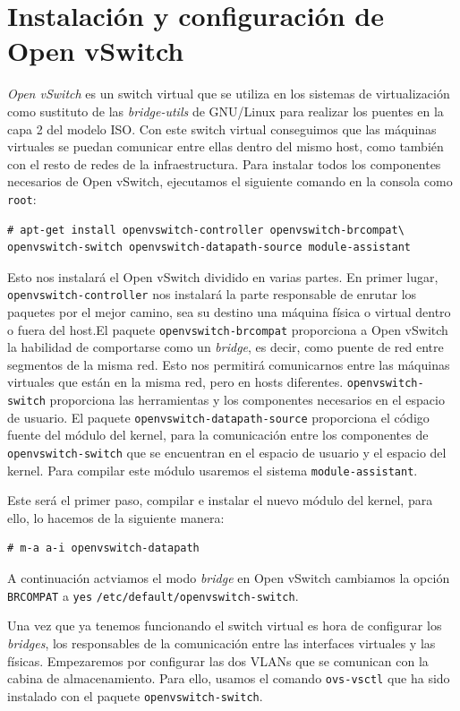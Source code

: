 \documentclass[12pt,a4paper,titlepage,twoside]{report}
\begin{document}
\section{Instalación y configuración de Open vSwitch}
\textit{Open vSwitch}\cite{ovs} es un switch virtual que se utiliza en los sistemas de virtualización como sustituto de las \textit{bridge-utils} de GNU/Linux para realizar los puentes en la capa 2 del modelo ISO. Con este switch virtual conseguimos que las máquinas virtuales se puedan comunicar entre ellas dentro del mismo host, como también con el resto de redes de la infraestructura.
Para instalar todos los componentes necesarios de Open vSwitch, ejecutamos el siguiente comando en la consola como \verb|root|: 
\begin{verbatim}
# apt-get install openvswitch-controller openvswitch-brcompat\
openvswitch-switch openvswitch-datapath-source module-assistant
\end{verbatim}
Esto nos instalará el Open vSwitch dividido en varias partes. En primer lugar, \verb|openvswitch-controller| nos instalará la parte responsable de enrutar los paquetes por el mejor camino, sea su destino una máquina física o virtual dentro o fuera del host.El paquete \verb|openvswitch-brcompat| proporciona a Open vSwitch la habilidad de comportarse como un \textit{bridge}, es decir, como puente de red entre segmentos de la misma red. Esto nos permitirá comunicarnos entre las máquinas virtuales que están en la misma red, pero en hosts diferentes. \verb|openvswitch-switch| proporciona las herramientas y los componentes necesarios en el espacio de usuario. El paquete \verb|openvswitch-datapath-source| proporciona el código fuente del módulo del kernel, para la comunicación entre los componentes de \verb|openvswitch-switch| que se encuentran en el espacio de usuario y el espacio del kernel. Para compilar este módulo usaremos el sistema \verb|module-assistant|.
\par
Este será el primer paso, compilar e instalar el nuevo módulo del kernel, para ello, lo hacemos de la siguiente manera:
\begin{verbatim}
# m-a a-i openvswitch-datapath 
\end{verbatim}
A continuación actviamos el modo \textit{bridge} en Open vSwitch cambiamos la opción \verb|BRCOMPAT| a \verb|yes| \verb|/etc/default/openvswitch-switch|.
\par
Una vez que ya tenemos funcionando el switch virtual es hora de configurar los \textit{bridges}, los responsables de la comunicación entre las interfaces virtuales y las físicas. Empezaremos por configurar las dos VLANs que se comunican con la cabina de almacenamiento. Para ello, usamos el comando \verb|ovs-vsctl| que ha sido instalado con el paquete \verb|openvswitch-switch|.
\end{document}

